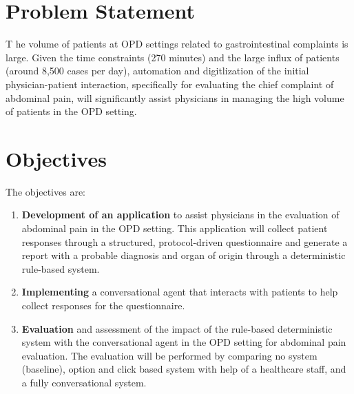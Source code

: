 \section{Problem Statement}
\lettrine{T}{ }he volume of patients at OPD settings related to gastrointestinal complaints is large. Given the time constraints (270 minutes) and the large influx of patients (around 8,500 cases per day), automation and digitlization of the initial physician-patient interaction, specifically for evaluating the chief complaint of abdominal pain, will significantly assist physicians in managing the high volume of patients in the OPD setting.

\section{Objectives}
The objectives are:
\begin{enumerate}
    \item \textcolor{TUMRed}{\textbf{Development of an application}} to assist physicians in the evaluation of abdominal pain in the OPD setting. This application will collect patient responses through a structured, protocol-driven questionnaire and generate a report with a probable diagnosis and organ of origin through a deterministic rule-based system.
    \item \textcolor{TUMRed}{\textbf{Implementing}} a conversational agent that interacts with patients to help collect responses for the questionnaire.
    \item \textcolor{TUMRed}{\textbf{Evaluation}} and assessment of the impact of the rule-based deterministic system with the conversational agent in the OPD setting for abdominal pain evaluation. The evaluation will be performed by comparing no system (baseline), option and click based system with help of a healthcare staff, and a fully conversational system.
\end{enumerate}
